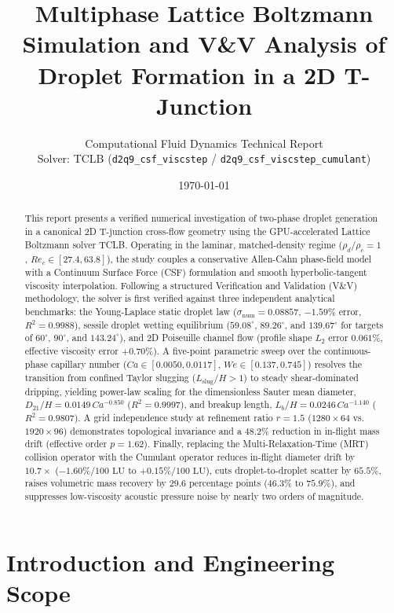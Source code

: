 \documentclass[11pt,a4paper]{article}
\title{\textbf{Multiphase Lattice Boltzmann Simulation and V\&V Analysis of Droplet Formation in a 2D T-Junction}}
\author{Computational Fluid Dynamics Technical Report \\ \small Solver: TCLB (\texttt{d2q9\_csf\_viscstep} / \texttt{d2q9\_csf\_viscstep\_cumulant})}
\date{\today}
\begin{document}
\maketitle

\begin{abstract}
This report presents a verified numerical investigation of two-phase droplet generation in a canonical 2D T-junction cross-flow geometry using the GPU-accelerated Lattice Boltzmann solver TCLB. Operating in the laminar, matched-density regime ($\rho_d/\rho_c = 1$, $Re_c \in [27.4, 63.8]$), the study couples a conservative Allen-Cahn phase-field model with a Continuum Surface Force (CSF) formulation and smooth hyperbolic-tangent viscosity interpolation. Following a structured Verification and Validation (V\&V) methodology, the solver is first verified against three independent analytical benchmarks: the Young-Laplace static droplet law ($\sigma_{\mathrm{num}} = 0.08857$, $-1.59\%$ error, $R^2 = 0.9988$), sessile droplet wetting equilibrium ($59.08^\circ$, $89.26^\circ$, and $139.67^\circ$ for targets of $60^\circ$, $90^\circ$, and $143.24^\circ$), and 2D Poiseuille channel flow (profile shape $L_2$ error $0.061\%$, effective viscosity error $+0.70\%$). A five-point parametric sweep over the continuous-phase capillary number ($Ca \in [0.0050, 0.0117]$, $We \in [0.137, 0.745]$) resolves the transition from confined Taylor slugging ($L_{\mathrm{slug}}/H > 1$) to steady shear-dominated dripping, yielding power-law scaling for the dimensionless Sauter mean diameter, $D_{21}/H = 0.0149\,Ca^{-0.850}$ ($R^2 = 0.9997$), and breakup length, $L_b/H = 0.0246\,Ca^{-1.140}$ ($R^2 = 0.9807$). A grid independence study at refinement ratio $r = 1.5$ ($1280 \times 64$ vs. $1920 \times 96$) demonstrates topological invariance and a $48.2\%$ reduction in in-flight mass drift (effective order $p = 1.62$). Finally, replacing the Multi-Relaxation-Time (MRT) collision operator with the Cumulant operator reduces in-flight diameter drift by $10.7\times$ ($-1.60\%/100\text{ LU}$ to $+0.15\%/100\text{ LU}$), cuts droplet-to-droplet scatter by $65.5\%$, raises volumetric mass recovery by $29.6$ percentage points ($46.3\%$ to $75.9\%$), and suppresses low-viscosity acoustic pressure noise by nearly two orders of magnitude.
\end{abstract}

\tableofcontents
\clearpage

\section{Introduction and Engineering Scope}
\end{document}
